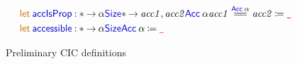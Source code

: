 \documentclass{article}
\newcommand{\meta}[1]{\mathsf{\textcolor{metacolour}{#1}}}
\newcommand{\ind}[1]{\mathsf{\textcolor{indcolour}{#1}}}
\newcommand{\constr}[1]{\mathsf{\textcolor{constrcolour}{#1}}}
\newcommand{\kw}[1]{\mathsf{\textcolor{kwcolour}{#1}}}
\newcommand{\kwopen}[1]{\kw{#1}\:}
\newcommand{\kwbin}[1]{\:\kw{#1}\:}
\newcommand{\annot}[2]{#1 \mathbin{:} #2}
\newcommand{\arr}[2]{#1 \mathbin{\rightarrow} \phantom{} #2}
\newcommand{\lam}[3]{\lambda #1 \mathbin{:} #2 \mathpunct{.} #3}
\newcommand{\app}[2]{#1 \: #2}
\newcommand{\App}[2]{#1 \: \mathopen{[} #2 \mathclose{]}}
\newcommand{\Let}[3]{\kwopen{let} #1 \mathbin{:} #2 \mathbin{\coloneqq} \phantom{} #3}
\newcommand{\Type}[1]{\ind{Type}_{#1}}
\newcommand{\Set}[1]{\ind{Set}}
\newcommand{\data}[3]{\kwopen{data} #1 \mathbin{:} #2 \kwbin{where} #3}
\newcommand{\Size}{\ind{Size}}
\newcommand{\Eq}{\ind{Eq}}
\newcommand{\refl}{\constr{refl}}
\newcommand{\equal}[3]{#1 \stackrel{#2}{=\joinrel=} #3}
\newcommand{\Nat}{\ind{Nat}}
\newcommand{\zero}[2]{\App{\constr{zero}_{#1}}{#2}}
\renewcommand{\succ}[3]{\app{\App{\constr{succ}_{#1}}{#2}}{#3}}
\newcommand{\Wtype}{\ind{W}}
\renewcommand{\sup}[4]{\app{\app{\App{\constr{sup}_{#1}}{#2}}{#3}}{#4}}
\newcommand{\Acc}{\ind{Acc}}
\newcommand{\szlt}{\mathbin{\ind{<}}}
\newcommand{\fst}{\ind{fst}}
\newcommand{\snd}{\ind{snd}}
\newcommand{\?}{\meta{?}}
\newcommand{\any}{\meta{\texttt{\_}}}
\theoremstyle{definition}
\begin{document}
\begin{figure}[!h]
\begin{align*}
        &\Let{\ind{accIsProp}}{\arr*{\alpha}{\Size}{\arr*{\mathit{acc1}, \mathit{acc2}}{\app{\Acc}{\alpha}}{\equal{\mathit{acc1}}{\app{\Acc}{\alpha}}{\mathit{acc2}}}}}{\any} \\
        &\Let{\ind{accessible}}{\arr*{\alpha}{\Size}{\app{\Acc}{\alpha}}}{\any} \\
        \iffalse
        \hfill \\
        &\data{\app{\Eq}{(\annot{A}{\Type{}})(\annot{a}{A})}}{\arr{A}{\Type{}}}{ \\
        &\quad\annot{\refl}{\app{\app{\app{\Eq}{A}}{a}}{a}}} \\
        \hfill \\
        &\data{\app{\ind{Pair}}{(\annot{A}{U})(\annot{B}{\arr{A}{U}})}}{U}{ \\
        &\quad \annot{\constr{pair}}{\arr*{a}{A}{\arr{\app{B}{a}}{\app{\app{\ind{Pair}}{A}}{B}}}}} \\
        &\Let{\fst}{\arr*{A}{U}{\arr*{B}{\arr{A}{U}}{\arr{\app{\app{\ind{Pair}}{A}}{B}}{A}}}}{\any} \\
        &\Let{\snd}{\arr*{A}{U}{\arr*{B}{\arr{A}{U}}{\arr*{p}{\app{\app{\ind{Pair}}{A}}{B}}{\app{B}{(\app{\fst}{p})}}}}}{\any} \\
        \hfill \\
        &\data{\app{\Nat}{(\annot{\alpha}{\Size})}}{\Set{1}}{ \\
        &\quad \annot{\zero*}{\arr*{\beta}{\Size}{\arr{\beta \szlt \alpha}{\app{\Nat}{\alpha}}}} \\
        &\quad \annot{\succ*}{\arr*{\beta}{\Size}{\arr{\beta \szlt \alpha}{\arr{\app{\Nat}{\beta}}{\app{\Nat}{\alpha}}}}}} \\
        \hfill \\
        &\data{\app{\Wtype}{(\annot{\alpha}{\Size})(\annot{A}{\Type{i}})(\annot{B}{\arr{A}{\Type{i}}})}}{\Set{i}}{ \\
        &\quad \annot{\sup*}{\arr*{\beta}{\Size}{\arr{\beta \szlt \alpha}{\arr*{a}{A}{\arr{(\arr{\app{B}{a}}{\app{\app{\app{\Wtype}{A}}{B}}{\beta}})}{\app{\app{\app{\Wtype}{A}}{B}}{\alpha}}}}}}} \\
        &\Let{\ind{mkW}}{\arr*{A}{\Type{i}}{\arr*{B}{\arr{A}{\Type{i}}}{\arr*{a}{A}{ \\
        &\qquad\arr{(\arr{\app{B}{a}}{\app{\app{\ind{Pair}}{\Size}}{(\lam{\alpha}{\Size}{\app{\app{\app{\Wtype}{A}}{B}}{\alpha}})}})}{ \\
        &\qquad \app{\app{\ind{Pair}}{\Size}}{(\lam{\alpha}{\Size}{\app{\app{\app{\Wtype}{A}}{B}}{\alpha}})}}}}}}{\any}
        \fi
    \end{align*}
    \caption{Preliminary CIC definitions}
    \label{fig:cic-defs-1}
\end{figure}
\end{document}
